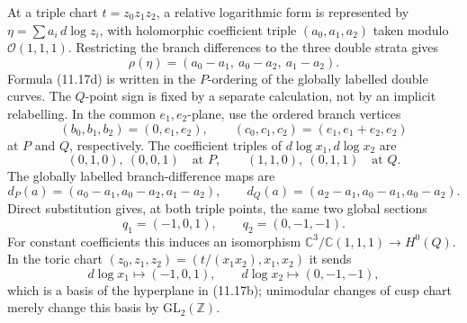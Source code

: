 \begin{remark}
At a triple chart $t=z_0z_1z_2$, a relative logarithmic form is represented
by $\eta=\sum a_i\,d\log z_i$, with holomorphic coefficient triple
$(a_0,a_1,a_2)$ taken modulo $\mathcal O(1,1,1)$.  Restricting the branch
differences to the three double strata gives
\[
 \rho(\eta)=(a_0-a_1,\ a_0-a_2,\ a_1-a_2).
\tag{11.17d}
\]
Formula (11.17d) is written in the $P$-ordering of the globally labelled
double curves.  The $Q$-point sign is fixed by a separate calculation, not by
an implicit relabelling.  In the common $e_1,e_2$-plane, use the ordered
branch vertices
\[
 (b_0,b_1,b_2)=(0,e_1,e_2),\qquad
 (c_0,c_1,c_2)=(e_1,e_1+e_2,e_2)
\]
at $P$ and $Q$, respectively.  The coefficient triples of
$d\log x_1,d\log x_2$ are
\[
 (0,1,0),\ (0,0,1)\quad\text{at }P,
 \qquad
 (1,1,0),\ (0,1,1)\quad\text{at }Q.
\]
The globally labelled branch-difference maps are
\[
 d_P(a)=(a_0-a_1,a_0-a_2,a_1-a_2),
 \qquad
 d_Q(a)=(a_2-a_1,a_0-a_1,a_0-a_2).
\tag{11.17d$'$}
\]
Direct substitution gives, at both triple points, the same two global
sections
\[
 q_1=(-1,0,1),\qquad q_2=(0,-1,-1).
\tag{11.17d$''$}
\]
For constant coefficients this induces an isomorphism
$\mathbb C^3/\mathbb C(1,1,1)\to H^0(Q)$.  In the toric chart
$(z_0,z_1,z_2)=(t/(x_1x_2),x_1,x_2)$ it sends
\[
 d\log x_1\longmapsto(-1,0,1),\qquad
 d\log x_2\longmapsto(0,-1,-1),
\]
which is a basis of the hyperplane in (11.17b); unimodular changes of cusp
chart merely change this basis by $\mathrm{GL}_2(\mathbb Z)$.


\end{remark}
